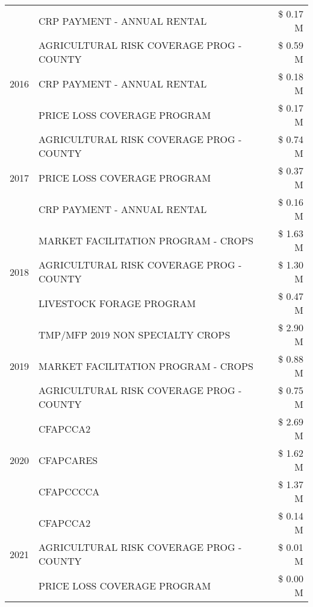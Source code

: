 \begin{tabular}{llr}
 & CRP PAYMENT - ANNUAL RENTAL & \$ 0.17 M \\
\cline{1-3}
\multirow[t]{3}{*}{2016} & AGRICULTURAL RISK COVERAGE PROG - COUNTY & \$ 0.59 M \\
 & CRP PAYMENT - ANNUAL RENTAL & \$ 0.18 M \\
 & PRICE LOSS COVERAGE PROGRAM & \$ 0.17 M \\
\cline{1-3}
\multirow[t]{3}{*}{2017} & AGRICULTURAL RISK COVERAGE PROG - COUNTY & \$ 0.74 M \\
 & PRICE LOSS COVERAGE PROGRAM & \$ 0.37 M \\
 & CRP PAYMENT - ANNUAL RENTAL & \$ 0.16 M \\
\cline{1-3}
\multirow[t]{3}{*}{2018} & MARKET FACILITATION PROGRAM - CROPS & \$ 1.63 M \\
 & AGRICULTURAL RISK COVERAGE PROG - COUNTY & \$ 1.30 M \\
 & LIVESTOCK FORAGE PROGRAM & \$ 0.47 M \\
\cline{1-3}
\multirow[t]{3}{*}{2019} & TMP/MFP 2019 NON SPECIALTY CROPS & \$ 2.90 M \\
 & MARKET FACILITATION PROGRAM - CROPS & \$ 0.88 M \\
 & AGRICULTURAL RISK COVERAGE PROG - COUNTY & \$ 0.75 M \\
\cline{1-3}
\multirow[t]{3}{*}{2020} & CFAPCCA2 & \$ 2.69 M \\
 & CFAPCARES & \$ 1.62 M \\
 & CFAPCCCCA & \$ 1.37 M \\
\cline{1-3}
\multirow[t]{3}{*}{2021} & CFAPCCA2 & \$ 0.14 M \\
 & AGRICULTURAL RISK COVERAGE PROG - COUNTY & \$ 0.01 M \\
 & PRICE LOSS COVERAGE PROGRAM & \$ 0.00 M \\
\cline{1-3}
\bottomrule
\end{tabular}
